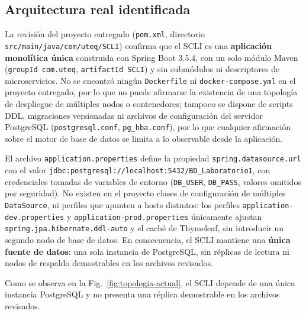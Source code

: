 \documentclass[conference]{IEEEtran}
\begin{document}
\subsection{Arquitectura real identificada}

La revisi\'on del proyecto entregado (\texttt{pom.xml}, directorio \texttt{src/main/java/com/uteq/SCLI}) confirma que el SCLI es una \textbf{aplicaci\'on monol\'itica \'unica} construida con Spring Boot 3.5.4, con un solo m\'odulo Maven (\texttt{groupId com.uteq}, \texttt{artifactId SCLI}) y sin subm\'odulos ni descriptores de microservicios. No se encontr\'o ning\'un \texttt{Dockerfile} ni \texttt{docker-compose.yml} en el proyecto entregado, por lo que no puede afirmarse la existencia de una topolog\'ia de despliegue de m\'ultiples nodos o contenedores; tampoco se dispone de scripts DDL, migraciones versionadas ni archivos de configuraci\'on del servidor PostgreSQL (\texttt{postgresql.conf}, \texttt{pg\_hba.conf}), por lo que cualquier afirmaci\'on sobre el motor de base de datos se limita a lo observable desde la aplicaci\'on.

El archivo \texttt{application.properties} define la propiedad \texttt{spring.datasource.url} con el valor \texttt{jdbc:postgresql://\allowbreak localhost:5432/\allowbreak BD\_Laboratorio1}, con credenciales tomadas de variables de entorno (\texttt{DB\_USER}, \texttt{DB\_PASS}, valores omitidos por seguridad). No existen en el proyecto clases de configuraci\'on de m\'ultiples \texttt{DataSource}, ni perfiles que apunten a hosts distintos: los perfiles \texttt{application-dev.properties} y \texttt{application-prod.properties} \'unicamente ajustan \texttt{spring.jpa.hibernate.ddl-auto} y el cach\'e de Thymeleaf, sin introducir un segundo nodo de base de datos. En consecuencia, el SCLI mantiene una \textbf{\'unica fuente de datos}: una sola instancia de PostgreSQL, sin r\'eplicas de lectura ni nodos de respaldo demostrables en los archivos revisados.

Como se observa en la Fig.~\ref{fig:topologia-actual}, el SCLI depende de una \'unica instancia PostgreSQL y no presenta una r\'eplica demostrable en los archivos revisados.
\end{document}
